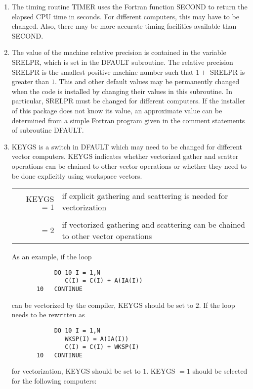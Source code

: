\begin{enumerate}
   \item
     The timing routine TIMER uses the Fortran function SECOND
     to return the elapsed CPU time in seconds.  For different
     computers, this may have to be changed.  Also, there may
     be more accurate timing facilities available than SECOND.
 
   \item
     The value of the machine relative precision is contained in
     the variable SRELPR, which is set in the DFAULT subroutine.
     The relative precision SRELPR is the smallest positive machine
     number such that $1 +$ SRELPR is greater than $1$.  This and other
     default values may be permanently changed when the code is
     installed by changing their values in this subroutine.  In
     particular, SRELPR must be changed for different computers.
     If the installer of this package does not know its value,
     an approximate value can be determined from a simple Fortran
     program given in the comment statements of subroutine DFAULT.
 
   \item
     KEYGS is a switch in DFAULT which may need to be changed for
     different vector computers.   KEYGS indicates whether
     vectorized gather and scatter operations can be chained to
     other vector operations or whether they need to be
     done explicitly using workspace vectors.
 
     \begin{tabular}{rp{5.0in}}
         KEYGS $=1$ & if explicit gathering and scattering
                      is needed for vectorization   \\
                    &  \\
               $=2$ & if vectorized gathering and scattering
                      can be chained to other vector operations
     \end{tabular}
 
     As an example, if the loop
     \begin{verbatim}
            DO 10 I = 1,N
               C(I) = C(I) + A(IA(I))
       10   CONTINUE
     \end{verbatim}
     can be vectorized by the compiler, KEYGS should be set to $2$.
     If the loop needs to be rewritten as
     \begin{verbatim}
            DO 10 I = 1,N
               WKSP(I) = A(IA(I))
               C(I) = C(I) + WKSP(I)
       10   CONTINUE
     \end{verbatim}
     for vectorization, KEYGS should be set to $1$.
     KEYGS $= 1$ should be selected for the following computers:
 

\end{enumerate}

